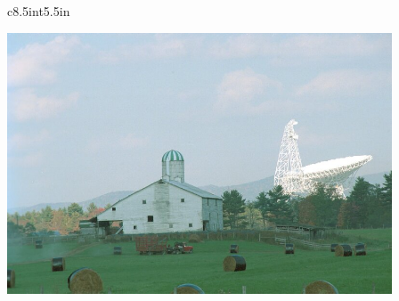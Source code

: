 \documentclass{book}
\begin{document}




% 





\newpage
\thispagestyle{empty}
\hphantom{foo}

\newpage
\thispagestyle{empty}
\hphantom{foo}

\newpage
\thispagestyle{empty}

\colorbox{coverpages}{
\begin{FrameCover}{c}{8.5in}{t}{5.5in}

\begin{center}
\FramePix[c]{4.5in}
{\bfseries \includegraphics[width=4.5in,bb=0 0 796 540]{telescopes-1867.jpg} }
\end{center}


\end{FrameCover}
}
\end{document}
